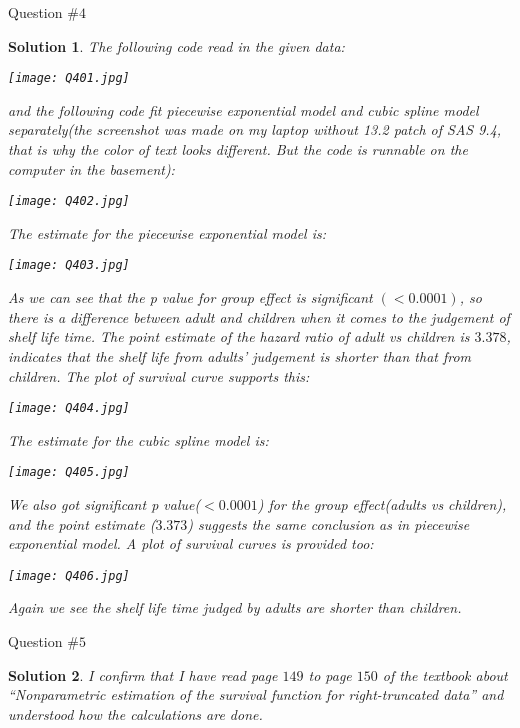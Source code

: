 \documentclass[11pt]{article}
\newtheorem{sol}{Solution}
\begin{document}
Question $\#4$
\begin{sol}
	The following code read in the given data:
	\begin{center}
		\texttt{[image: Q401.jpg]}
	\end{center}
	and the following code fit piecewise exponential model and cubic spline model separately(the screenshot was made on my laptop without 13.2 patch of SAS 9.4, that is why the color of text looks different. But the code is runnable on the computer in the basement):
	\begin{center}
		\texttt{[image: Q402.jpg]}
	\end{center}
	The estimate for the piecewise exponential model is:
	\begin{center}
		\texttt{[image: Q403.jpg]}
	\end{center}
	As we can see that the p value for group effect is significant $(<0.0001)$, so there is a difference between adult and children when it comes to the judgement of shelf life time. The point estimate of the hazard ratio of adult vs children is $3.378$, indicates that the shelf life from adults' judgement is shorter than that from children. \vskip 2mm
	The plot of survival curve supports this:
	\begin{center}
		\texttt{[image: Q404.jpg]}
	\end{center}
	The estimate for the cubic spline model is:
	\begin{center}
		\texttt{[image: Q405.jpg]}
	\end{center}
	We also got significant p value($<0.0001$) for the group effect(adults vs children), and the point estimate ($3.373$) suggests the same conclusion as in piecewise exponential model.\vskip 2mm
	A plot of survival curves is provided too:
	\begin{center}
		\texttt{[image: Q406.jpg]}
	\end{center}
	Again we see the shelf life time judged by adults are shorter than children.
\end{sol}

Question $\#5$
\begin{sol}
	I confirm that I have read page $149$ to page $150$ of the textbook about ``Nonparametric estimation of the survival function for right-truncated data'' and understood how the calculations are done.
\end{sol}
\end{document}
